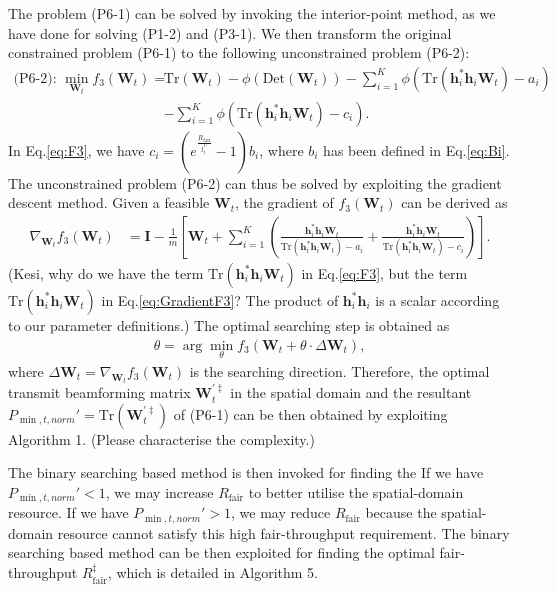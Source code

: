 \documentclass[12pt,draftcls,onecolumn,journal]{IEEEtran}
\begin{document}
The problem (P6-1) can be solved by invoking the interior-point method, as we have done for solving (P1-2) and (P3-1). We then transform the original constrained problem (P6-1) to the following unconstrained problem (P6-2):
\begin{align}
	\text{(P6-2): }  \min_{\mathbf{W}_t} f_3(\mathbf{W}_t) = &\text{Tr}(\mathbf{W}_t) - \phi(\text{Det}(\mathbf{W}_t)) - \sum_{i=1}^{K}\phi\left(\text{Tr}(\mathbf{h}_i^*\mathbf{h}_i\mathbf{W}_t) - a_i\right) \nonumber\\
	& - \sum_{i=1}^{K}\phi\left(\text{Tr}(\mathbf{h}_i^*\mathbf{h}_i\mathbf{W}_t) - c_i\right). \label{eq:F3}
\end{align}
In Eq.\eqref{eq:F3}, we have $c_i = (e^{\frac{R_{\text{fair}}}{t_i^U}} - 1)b_i$, where $b_i$ has been defined in Eq.\eqref{eq:Bi}. The unconstrained problem (P6-2) can thus be solved by exploiting the gradient descent method. Given a feasible $\mathbf{W}_t$, the gradient of $f_3(\mathbf{W}_t)$ can be derived as
\begin{align}
	\nabla_{\mathbf{W}_t}f_3(\mathbf{W}_t) &= \mathbf{I} - \frac{1}{m}\left[\mathbf{W}_t + \sum_{i=1}^K\left(\frac{\mathbf{h}_i^*\mathbf{h}_i\mathbf{W}_t}{\text{Tr}(\mathbf{h}_i^*\mathbf{h}_i\mathbf{W}_t)-a_i} + \frac{\mathbf{h}_i^*\mathbf{h}_i\mathbf{W}_t}{\text{Tr}(\mathbf{h}_i^*\mathbf{h}_i\mathbf{W}_t)-c_i}\right)\right]. \label{eq:GradientF3}
\end{align}
{\color{red} (Kesi, why do we have the term $\text{Tr}(\mathbf{h}_i^*\mathbf{h}_i\mathbf{W}_t)$ in Eq.\eqref{eq:F3}, but the term $\text{Tr}(\mathbf{h}_i^*\mathbf{h}_i\mathbf{W}_t)$ in Eq.\eqref{eq:GradientF3}? The product of $\mathbf{h}_i^*\mathbf{h}_i$ is a scalar according to our parameter definitions.)} The optimal searching step is obtained as
\begin{align}
	\theta = \arg \min_{\theta} f_3(\mathbf{W}_t + \theta\cdot \Delta \mathbf{W}_t), \label{eq:SearchStepF3}
\end{align}
where $\Delta \mathbf{W}_t = \nabla_{\mathbf{W}_t}f_3(\mathbf{W}_t)$ is the searching direction. Therefore, the optimal transmit beamforming matrix $\mathbf{W}_{t}^{'\ddagger}$ in the spatial domain and the resultant $P_{\min, t,norm}' = \text{Tr}(\mathbf{W}_{t}^{'\ddagger})$ of (P6-1) can be then obtained by exploiting Algorithm 1. {\color{red} (Please characterise the complexity.)}

The binary searching based method is then invoked for finding the If we have $P_{\min, t,norm}' < 1$, we may increase $R_{\text{fair}}$ to better utilise the spatial-domain resource. If we have $P_{\min, t,norm}' > 1$, we may reduce $R_{\text{fair}}$ because the spatial-domain resource cannot satisfy this high fair-throughput requirement. The binary searching based method can be then exploited for finding the optimal fair-throughput $R_{\text{fair}}^{\ddagger}$, which is detailed in Algorithm 5. 
\end{document}
